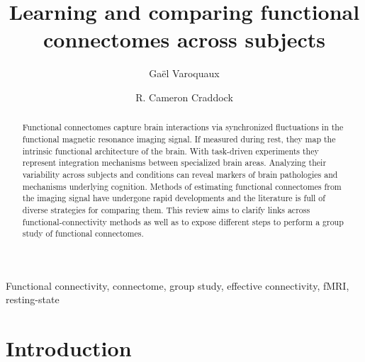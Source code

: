 \documentclass[5p]{elsarticle}
\begin{document}
\title{Learning and comparing functional connectomes across subjects}


\author[parietal,unicog,cea]{Ga\"el Varoquaux}
\author[cmi,nki]{R. Cameron Craddock}


\address[parietal]{Parietal project-team, INRIA Saclay-\^ile de France}
\address[unicog]{INSERM, U992}
\address[cea]{CEA/Neurospin b\^at 145, 91191 Gif-Sur-Yvette}
\address[cmi]{Child Mind Institute, New York, New York}
\address[nki]{Nathan Kline Institute for Psychiatric Research, Orangeburg, New York}

\begin{abstract}
	Functional connectomes capture brain interactions via synchronized
	fluctuations in the functional magnetic resonance imaging signal. If
	measured during rest, they map the intrinsic functional architecture of
	the brain. With task-driven experiments they represent integration
	mechanisms between specialized brain areas. Analyzing their variability
	across subjects and conditions can reveal
	markers of brain pathologies and mechanisms underlying cognition.
	Methods of estimating functional connectomes from the imaging signal
	have undergone rapid developments and the literature is full of diverse
	strategies for comparing them. This review aims to clarify links across
	functional-connectivity methods as well as to expose different steps 
	to perform a group study of functional connectomes.
\end{abstract}

\begin{keyword}
    Functional connectivity, connectome, group study, effective
    connectivity, fMRI, resting-state
\end{keyword}

\maketitle

\sloppy %

\section{Introduction}
\end{document}
